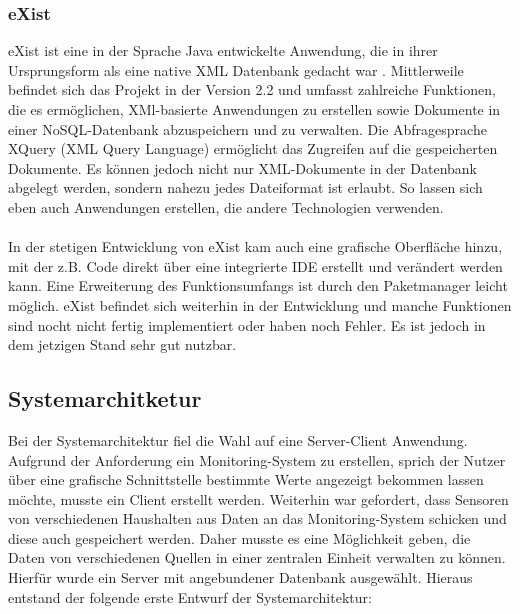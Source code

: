 \subsubsection{eXist}
eXist \cite{existwebsite} ist eine in der Sprache Java entwickelte Anwendung, die in ihrer Ursprungsform als eine native XML Datenbank gedacht war \cite{siegel:exist}. Mittlerweile befindet sich das Projekt in der Version 2.2 und umfasst zahlreiche Funktionen, die es ermöglichen, XMl-basierte Anwendungen zu erstellen sowie Dokumente in einer NoSQL-Datenbank abzuspeichern und zu verwalten. Die Abfragesprache XQuery (XML Query Language) ermöglicht das Zugreifen auf die gespeicherten Dokumente. Es können jedoch nicht nur XML-Dokumente in der Datenbank abgelegt werden, sondern nahezu jedes Dateiformat ist erlaubt. So lassen sich eben auch Anwendungen erstellen, die andere Technologien verwenden.
\\
\\
In der stetigen Entwicklung von eXist kam auch eine grafische Oberfläche hinzu, mit der z.B. Code direkt über eine integrierte IDE erstellt und verändert werden kann. Eine Erweiterung des Funktionsumfangs ist durch den Paketmanager leicht möglich. eXist befindet sich weiterhin in der Entwicklung und manche Funktionen sind nocht nicht fertig implementiert oder haben noch Fehler. Es ist jedoch in dem jetzigen Stand sehr gut nutzbar.

\subsection{Systemarchitketur}
Bei der Systemarchitektur fiel die Wahl auf eine Server-Client Anwendung. Aufgrund der Anforderung ein Monitoring-System zu erstellen, sprich der Nutzer über eine grafische Schnittstelle bestimmte Werte angezeigt bekommen lassen möchte, musste ein Client erstellt werden. Weiterhin war gefordert, dass Sensoren von verschiedenen Haushalten aus Daten an das Monitoring-System schicken und diese auch gespeichert werden. Daher musste es eine Möglichkeit geben, die Daten von verschiedenen Quellen in einer zentralen Einheit verwalten zu können. Hierfür wurde ein Server mit angebundener Datenbank ausgewählt. Hieraus entstand der folgende erste Entwurf der Systemarchitektur:

